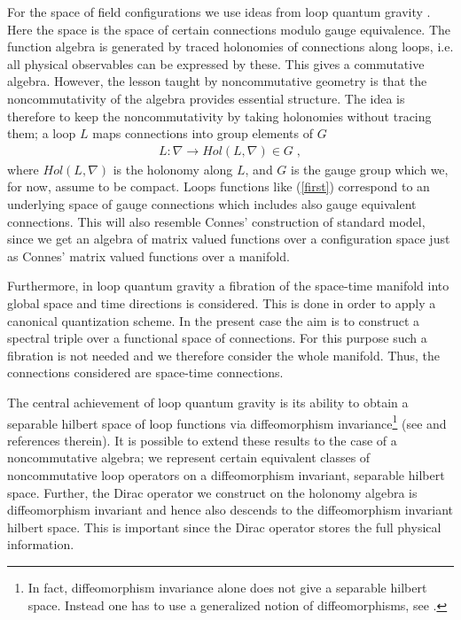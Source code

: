 \documentclass[12pt]{article}
\newcommand{\ba}{\begin{eqnarray}}
\newcommand{\ea}{\end{eqnarray}}
\begin{document}
For the space of field configurations we use ideas from loop quantum gravity \cite{Ashtekar:2004eh}. Here the space is
the space of certain connections modulo gauge equivalence. The function algebra is
generated by traced holonomies of connections along loops, i.e. all physical observables can
be expressed by these. This gives a commutative
algebra. However, the lesson taught by noncommutative geometry is that
the noncommutativity of the algebra provides essential structure. The idea is
therefore to keep the noncommutativity by taking holonomies without tracing
them; a loop $L$ maps connections into group elements of $G$
\ba
L:\nabla\rightarrow Hol(L,\nabla)\in G\;,
\label{first}
\ea
where $Hol(L,\nabla)$ is the holonomy along $L$, and $G$ is the gauge
group which we, for now, assume to be compact. Loops functions like (\ref{first})
 correspond to an underlying space of gauge connections which includes also gauge
 equivalent connections.
 This will also resemble Connes'
construction of standard model, since we get an algebra of matrix valued functions over a
configuration space just as Connes' matrix valued functions over a manifold.

Furthermore, in loop quantum gravity a fibration of the space-time
manifold into global space and time directions is considered. This is done in order to apply
a canonical quantization scheme. In the present case the aim is to construct a
spectral triple over a functional space of connections. For this purpose such a
fibration is not needed and we therefore consider the whole
manifold. Thus, the connections considered are space-time connections.


The central achievement of loop quantum gravity is its ability to obtain a
separable hilbert space of loop functions via diffeomorphism
invariance\footnote{In fact, diffeomorphism invariance alone does not give a
  separable hilbert space. Instead one has to use a generalized notion of
  diffeomorphisms, see \cite{Fairbairn:2004qe}.} (see \cite{Fairbairn:2004qe} and references therein). It is possible to extend these results to the case of a
noncommutative algebra; we represent certain equivalent classes of noncommutative loop
operators on a diffeomorphism invariant, separable hilbert space. Further,
the Dirac operator we construct on the holonomy algebra is diffeomorphism invariant and hence also
descends to the diffeomorphism invariant hilbert space. This is important
since the Dirac operator stores the full physical information. \\
\end{document}
